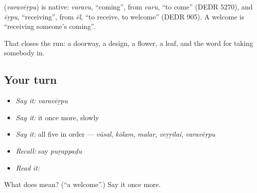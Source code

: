 \begin{cousinweb}
\textbf{} (\emph{varavēṟpu}) is native: \emph{varavu}, \textquotedblleft{}coming\textquotedblright{}, from \emph{varu}, \textquotedblleft{}to come\textquotedblright{} (DEDR 5270), and \emph{ēṟpu}, \textquotedblleft{}receiving\textquotedblright{}, from \emph{ēl}, \textquotedblleft{}to receive, to welcome\textquotedblright{} (DEDR 905). A welcome is \textquotedblleft{}receiving someone's coming\textquotedblright{}.
\end{cousinweb}

\begin{grammarlens}[title={What you've built}]
That closes the run: a doorway, a design, a flower, a leaf, and the word for taking somebody in.
\end{grammarlens}

\subsection*{Your turn}
\begin{itemize}
\raggedright
  \item \emph{Say it:} \emph{varavēṟpu}
  \item \emph{Say it:} it once more, slowly
  \item \emph{Say it:} all five in order — \emph{vāsal}, \emph{kōlam}, \emph{malar}, \emph{veṟṟilai}, \emph{varavēṟpu}
  \item \emph{Recall:} say \emph{puṟappaḍu}
  \item \emph{Read it:} \textbf{ }
\end{itemize}

\begin{tcolorbox}[breakable,colback=teal!4,colframe=teal!35!black,title={Before you move on}]
What does  mean? (\textquotedblleft{}a welcome\textquotedblright{}.) Say it once more.
\end{tcolorbox}
